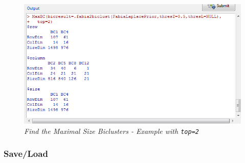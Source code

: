 \documentclass[a4paper]{article}\usepackage[]{graphicx}\usepackage[]{color}
\begin{document}
\begin{figure}[H]
\centering
\includegraphics[scale=0.4]{figures/MaxBC_example.png}
\caption{{\it Find the Maximal Size Biclusters - Example with \texttt{top=2}}\label{maxbc_example}}
\end{figure}

\subsubsection{Save/Load}\label{sec:SaveLoad}
\end{document}
